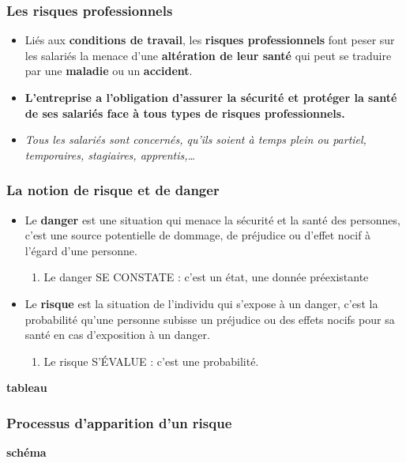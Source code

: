 \documentclass{beamer}
\begin{document}
\begin{frame}
\frametitle{Les risques professionnels}
\begin{itemize}
\item Liés aux \textbf{conditions de travail}, les \textbf{risques professionnels} font peser sur les salariés la menace d’une \textbf{altération de leur santé} qui peut se traduire par une \textbf{maladie} ou un \textbf{accident}.

\item \textbf{L’entreprise a l’obligation d'assurer la sécurité et protéger la santé de ses salariés face à tous types de risques professionnels. }

\item \textit{Tous les salariés sont concernés, qu'ils soient à temps plein ou partiel, temporaires, stagiaires, apprentis,…}
\end{itemize}
\end{frame} 

\begin{frame}
\frametitle{La notion de risque et de danger}
\begin{itemize}
\item Le \textbf{danger} est une situation qui menace la sécurité et la santé des personnes, c’est une source potentielle de dommage, de préjudice ou d'effet nocif à l'égard d'une personne.
\begin{enumerate}
	\item Le danger SE CONSTATE : c’est un état, une donnée préexistante
\end{enumerate}


\item Le \textbf{risque} est la situation de l’individu qui s’expose à un danger, c’est la probabilité qu'une personne subisse un préjudice ou des effets nocifs pour sa santé en cas d'exposition à un danger.
\begin{enumerate}
	\item Le risque S’ÉVALUE : c’est une probabilité.
	\end{enumerate}
\end{itemize}

\textbf{tableau}
\end{frame}


\begin{frame}
\frametitle{Processus d’apparition d’un risque}

\textbf{schéma}
\end{frame}
\end{document}
